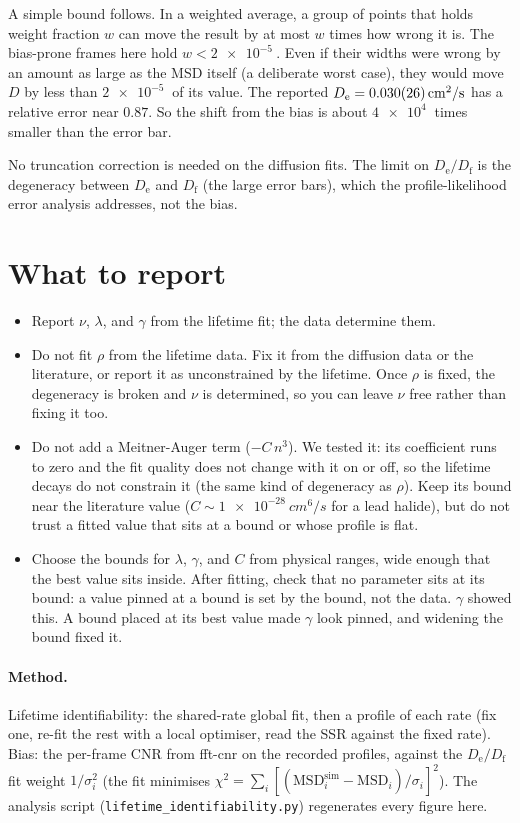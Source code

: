 \documentclass[11pt]{article}
\newcommand{\De}{D_{\mathrm{e}}}
\newcommand{\Df}{D_{\mathrm{f}}}
\begin{document}
A simple bound follows. In a weighted average, a group of points that holds
weight fraction $w$ can move the result by at most $w$ times how wrong it is. The
bias-prone frames here hold $w < \SI{2e-5}{}$. Even if their widths were wrong by
an amount as large as the MSD itself (a deliberate worst case), they would move
$D$ by less than $\SI{2e-5}{}$ of its value. The reported
$\De = \SI{0.030 +- 0.026}{cm^2/s}$ has a relative error near $0.87$. So the shift
from the bias is about $\SI{4e4}{}$ times smaller than the error bar.

No truncation correction is needed on the diffusion fits. The limit on $\De/\Df$
is the degeneracy between $\De$ and $\Df$ (the large error bars), which the
profile-likelihood error analysis addresses, not the bias.

\section{What to report}

\begin{itemize}\itemsep2pt
\item Report $\nu$, $\lambda$, and $\gamma$ from the lifetime fit; the data
determine them.
\item Do not fit $\rho$ from the lifetime data. Fix it from the diffusion data or
the literature, or report it as unconstrained by the lifetime. Once $\rho$ is
fixed, the degeneracy is broken and $\nu$ is determined, so you can leave $\nu$
free rather than fixing it too.
\item Do not add a Meitner-Auger term ($-C\,n^{3}$). We tested it: its
coefficient runs to zero and the fit quality does not change with it on or off,
so the lifetime decays do not constrain it (the same kind of degeneracy as
$\rho$). Keep its bound near the literature value ($C \sim \SI{1e-28}{cm^6/s}$
for a lead halide), but do not trust a fitted value that sits at a bound or whose
profile is flat.
\item Choose the bounds for $\lambda$, $\gamma$, and $C$ from physical ranges,
wide enough that the best value sits inside. After fitting, check that no
parameter sits at its bound: a value pinned at a bound is set by the bound, not
the data. $\gamma$ showed this. A bound placed at its best value made $\gamma$
look pinned, and widening the bound fixed it.
\end{itemize}

\paragraph{Method.}
Lifetime identifiability: the shared-rate global fit, then a profile of each rate
(fix one, re-fit the rest with a local optimiser, read the SSR against the fixed
rate). Bias: the per-frame CNR from fft-cnr on the recorded profiles, against the
$\De/\Df$ fit weight $1/\sigma_i^2$ (the fit minimises
$\chi^2 = \sum_i [(\mathrm{MSD}^{\mathrm{sim}}_i - \mathrm{MSD}_i)/\sigma_i]^2$).
The analysis script (\texttt{lifetime\_identifiability.py}) regenerates every
figure here.
\end{document}
